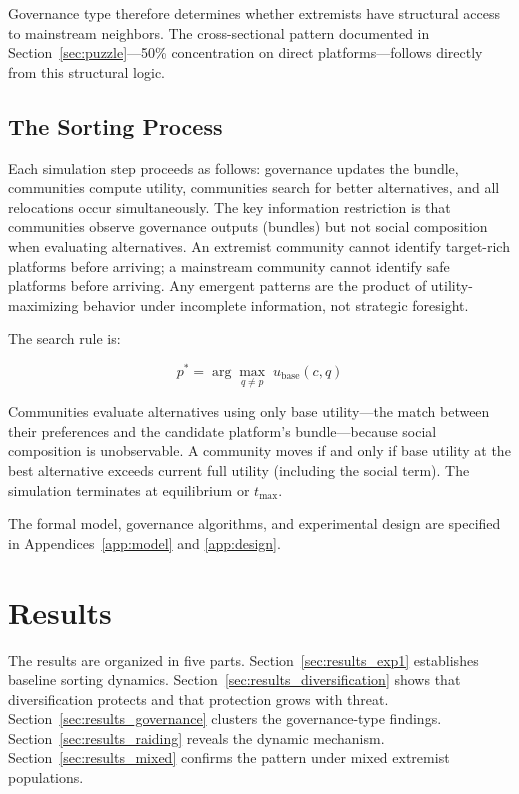 \documentclass{article}
\begin{document}
Governance type therefore determines whether extremists have structural access to mainstream neighbors. The cross-sectional pattern documented in Section~\ref{sec:puzzle}---50\% concentration on direct platforms---follows directly from this structural logic.

\subsection{The Sorting Process}

Each simulation step proceeds as follows: governance updates the bundle, communities compute utility, communities search for better alternatives, and all relocations occur simultaneously. The key information restriction is that communities observe governance outputs (bundles) but not social composition when evaluating alternatives. An extremist community cannot identify target-rich platforms before arriving; a mainstream community cannot identify safe platforms before arriving. Any emergent patterns are the product of utility-maximizing behavior under incomplete information, not strategic foresight.

The search rule is:

\begin{equation}
p^* = \arg\max_{q \neq p} \; u_{\text{base}}(c, q)
\label{eq:search}
\end{equation}

\noindent Communities evaluate alternatives using only base utility---the match between their preferences and the candidate platform's bundle---because social composition is unobservable. A community moves if and only if base utility at the best alternative exceeds current full utility (including the social term). The simulation terminates at equilibrium or $t_{\max}$.

The formal model, governance algorithms, and experimental design are specified in Appendices~\ref{app:model} and \ref{app:design}.

\section{Results}
\label{sec:results}

The results are organized in five parts. Section~\ref{sec:results_exp1} establishes baseline sorting dynamics. Section~\ref{sec:results_diversification} shows that diversification protects and that protection grows with threat. Section~\ref{sec:results_governance} clusters the governance-type findings. Section~\ref{sec:results_raiding} reveals the dynamic mechanism. Section~\ref{sec:results_mixed} confirms the pattern under mixed extremist populations.
\end{document}
